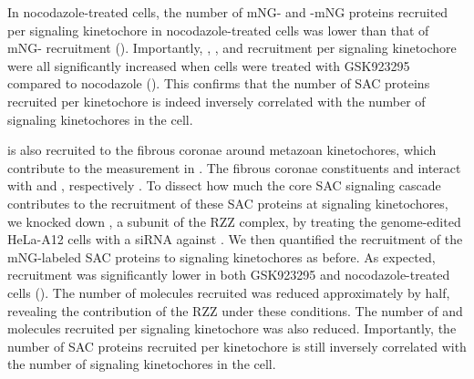 \begin{figure}
\label{SACProteinKinetochoreRecruitment}
\end{figure}

In nocodazole-treated cells, the number of mNG- and -mNG proteins recruited per signaling kinetochore in nocodazole-treated cells was lower than that of mNG- recruitment (). Importantly, , , and  recruitment per signaling kinetochore were all significantly increased when cells were treated with GSK923295 compared to nocodazole (). This confirms that the number of SAC proteins recruited per kinetochore is indeed inversely correlated with the number of signaling kinetochores in the cell.%

 is also recruited to the fibrous coronae around metazoan kinetochores, which contribute to the measurement in . The fibrous coronae constituents  and  interact with  and , respectively \cite{CENPELocalization-BUBR1, CENP-FLimitsStripping}. %
To dissect how much the core SAC signaling cascade contributes to the recruitment of these SAC proteins at signaling kinetochores, we knocked down , a subunit of the RZZ complex, by treating the genome-edited HeLa-A12 cells with a siRNA against . We then quantified the recruitment of the mNG-labeled SAC proteins to signaling kinetochores as before. As expected,  recruitment was significantly lower in both GSK923295 and nocodazole-treated cells (). The number of  molecules recruited was reduced approximately by half, revealing the contribution of the RZZ under these conditions. The number of  and  molecules recruited per signaling kinetochore was also reduced. %
Importantly, the number of SAC proteins recruited per kinetochore is still inversely correlated with the number of signaling kinetochores in the cell.